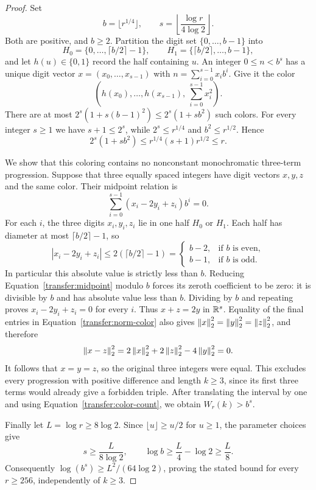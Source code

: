 \begin{proof}
Set
\[
 b=\lfloor r^{1/4}\rfloor,\qquad
 s=\left\lfloor\frac{\log r}{4\log2}\right\rfloor.
\]
Both are positive, and $b\ge2$.  Partition the digit set
$\{0,\ldots,b-1\}$ into
\[
 H_0=\{0,\ldots,\lceil b/2\rceil-1\},\qquad
 H_1=\{\lceil b/2\rceil,\ldots,b-1\},
\]
and let $h(u)\in\{0,1\}$ record the half containing $u$.
An integer $0\le n<b^s$ has a unique digit vector
$x=(x_0,\ldots,x_{s-1})$ with
$n=\sum_{i=0}^{s-1}x_i b^i$.  Give it the color
\begin{equation}
 \left(h(x_0),\ldots,h(x_{s-1}),\ \sum_{i=0}^{s-1}x_i^2\right).
 \label{transfer:norm-color}
\end{equation}
There are at most $2^s(1+s(b-1)^2)\le2^s(1+sb^2)$ such colors.
For every integer $s\ge1$ we have $s+1\le2^s$, while
$2^s\le r^{1/4}$ and $b^2\le r^{1/2}$.  Hence
\begin{equation}
 2^s(1+sb^2)
 \le r^{1/4}(s+1)r^{1/2}
 \le r.
 \label{transfer:color-count}
\end{equation}

We show that this coloring contains no nonconstant monochromatic
three-term progression.  Suppose that three equally spaced integers
have digit vectors $x,y,z$ and the same color.  Their midpoint relation
is
\begin{equation}
 \sum_{i=0}^{s-1}(x_i-2y_i+z_i)b^i=0.
 \label{transfer:midpoint}
\end{equation}
For each $i$, the three digits $x_i,y_i,z_i$ lie in one half $H_0$ or
$H_1$.  Each half has diameter at most $\lceil b/2\rceil-1$, so
\[
 |x_i-2y_i+z_i|
 \le2(\lceil b/2\rceil-1)
 =\begin{cases}
 b-2,&\text{if $b$ is even},\\
 b-1,&\text{if $b$ is odd}.
 \end{cases}
\]
In particular this absolute value is strictly less than $b$.
Reducing Equation~\eqref{transfer:midpoint} modulo $b$ forces its
zeroth coefficient to be zero: it is divisible by $b$ and has absolute
value less than $b$.  Dividing by $b$ and repeating proves
$x_i-2y_i+z_i=0$ for every $i$.  Thus $x+z=2y$ in $\mathbb R^s$.
Equality of the final entries in Equation~\eqref{transfer:norm-color}
also gives $\left\lVert x\right\rVert_2^2=\left\lVert y\right\rVert_2^2=\left\lVert z\right\rVert_2^2$, and therefore
\[
 \left\lVert x-z\right\rVert_2^2
 =2\left\lVert x\right\rVert_2^2+2\left\lVert z\right\rVert_2^2-4\left\lVert y\right\rVert_2^2=0.
\]
It follows that $x=y=z$, so the original three integers were equal.
This excludes every progression with positive difference and length
$k\ge3$, since its first three terms would already give a forbidden
triple.  After translating the interval by one and using
Equation~\eqref{transfer:color-count}, we obtain $W_r(k)>b^s$.

Finally let $L=\log r\ge8\log2$.  Since
$\lfloor u\rfloor\ge u/2$ for $u\ge1$, the parameter choices give
\[
 s\ge\frac{L}{8\log2},\qquad
 \log b\ge\frac L4-\log2\ge\frac L8.
\]
Consequently $\log(b^s)\ge L^2/(64\log2)$, proving the stated bound
for every $r\ge256$, independently of $k\ge3$.
\end{proof}

